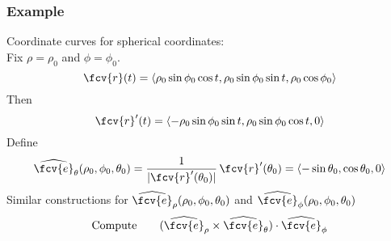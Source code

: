 \begin{frame}
  \frametitle{Example}
  Coordinate curves for spherical coordinates:\\
  Fix $\rho = \rho_0$ and $\phi = \phi_0$.
  $$\fcv{r}(t) = \langle \rho_0\sin\phi_0 \cos{t}, \rho_0\sin\phi_0 \sin{t}, \rho_0\cos\phi_0\rangle$$
  \pause Then
  $$\fcv{r}'(t) = \langle -\rho_0\sin\phi_0 \sin{t}, \rho_0\sin\phi_0 \cos{t}, 0\rangle$$
  Define
  $$\widehat{\fcv{e}}_\theta (\rho_0,\phi_0,\theta_0) = \frac{1}{|\fcv{r}'(\theta_0)|}\,\fcv{r}'(\theta_0) = \langle -\sin{\theta_0},\cos{\theta_0},0\rangle$$
  Similar constructions for $\widehat{\fcv{e}}_\rho (\rho_0,\phi_0,\theta_0)$ and
  $\widehat{\fcv{e}}_\phi (\rho_0,\phi_0,\theta_0)$
  $$\text{Compute}\qquad
  (\widehat{\fcv{e}}_{\rho} \times
  \widehat{\fcv{e}}_{\theta})\cdot
  \widehat{\fcv{e}}_{\phi}$$
\end{frame}